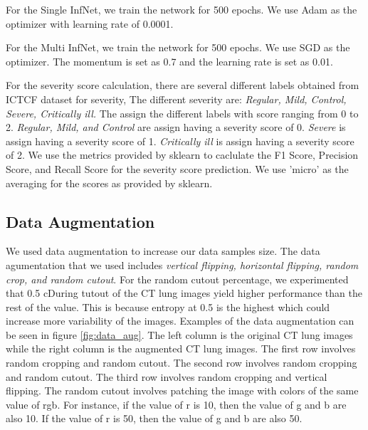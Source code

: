 For the Single InfNet, we train the network for 500 epochs. We use Adam as the optimizer with learning rate of 0.0001. 

For the Multi InfNet, we train the network for 500 epochs. We use SGD as the optimizer. The momentum is set as 0.7 and the learning rate is set as 0.01.

For the severity score calculation, there are several different labels obtained from ICTCF dataset for severity, The different severity are: \textit{Regular, Mild, Control, Severe, Critically ill.}  The assign the different labels with score ranging from 0 to 2. \textit{Regular, Mild, and Control} are assign having a severity score of 0. \textit{Severe} is assign having a severity score of 1. \textit{Critically ill} is assign having a severity score of 2. We use the metrics provided by sklearn to caclulate the F1 Score, Precision Score, and Recall Score for the severity score prediction. We use 'micro' as the averaging for the scores as provided by sklearn.

\subsection{Data Augmentation}
We used data augmentation to increase our data samples size. The data agumentation that we used includes \textit{vertical flipping, horizontal flipping, random crop, and random cutout}. For the random cutout percentage, we experimented that 0.5 cDuring tutout of the CT lung images yield higher performance than the rest of the value. This is because entropy at 0.5 is the highest which could increase more variability of the images. Examples of the data augmentation can be seen in figure \ref{fig:data_aug}.
The left column is the original CT lung images while the right column is the augmented CT lung images. The first row involves random cropping and random cutout. The second row involves random cropping and random cutout. The third row involves random cropping and vertical flipping. The random cutout involves patching the image with colors of the same value of rgb. For instance, if the value of r is 10, then the value of g and b are also 10. If the value of r is 50, then the value of g and b are also 50.


